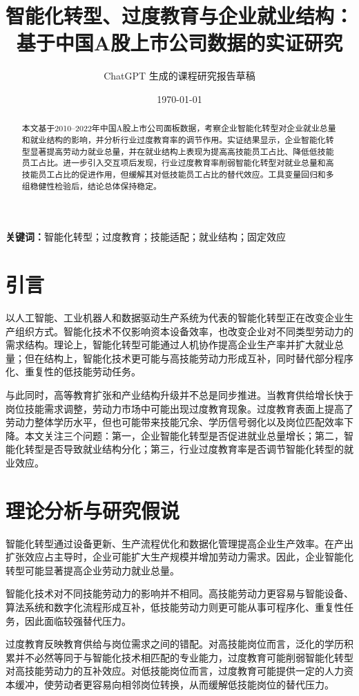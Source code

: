 \documentclass[UTF8,zihao=-4]{ctexart}
\title{智能化转型、过度教育与企业就业结构：基于中国A股上市公司数据的实证研究}
\author{ChatGPT 生成的课程研究报告草稿}
\date{\today}
\begin{document}
\maketitle

\begin{abstract}
本文基于2010--2022年中国A股上市公司面板数据，考察企业智能化转型对企业就业总量和就业结构的影响，并分析行业过度教育率的调节作用。实证结果显示，企业智能化转型显著提高劳动力就业总量，并在就业结构上表现为提高高技能员工占比、降低低技能员工占比。进一步引入交互项后发现，行业过度教育率削弱智能化转型对就业总量和高技能员工占比的促进作用，但缓解其对低技能员工占比的替代效应。工具变量回归和多组稳健性检验后，结论总体保持稳定。
\end{abstract}

\noindent\textbf{关键词：}智能化转型；过度教育；技能适配；就业结构；固定效应

\section{引言}
以人工智能、工业机器人和数据驱动生产系统为代表的智能化转型正在改变企业生产组织方式。智能化技术不仅影响资本设备效率，也改变企业对不同类型劳动力的需求结构。理论上，智能化转型可能通过人机协作提高企业生产率并扩大就业总量；但在结构上，智能化技术更可能与高技能劳动力形成互补，同时替代部分程序化、重复性的低技能劳动任务。

与此同时，高等教育扩张和产业结构升级并不总是同步推进。当教育供给增长快于岗位技能需求调整，劳动力市场中可能出现过度教育现象。过度教育表面上提高了劳动力整体学历水平，但也可能带来技能冗余、学历信号弱化以及岗位匹配效率下降。本文关注三个问题：第一，企业智能化转型是否促进就业总量增长；第二，智能化转型是否导致就业结构分化；第三，行业过度教育率是否调节智能化转型的就业效应。

\section{理论分析与研究假说}
智能化转型通过设备更新、生产流程优化和数据化管理提高企业生产效率。在产出扩张效应占主导时，企业可能扩大生产规模并增加劳动力需求。因此，企业智能化转型可能显著提高企业劳动力就业总量。

智能化技术对不同技能劳动力的影响并不相同。高技能劳动力更容易与智能设备、算法系统和数字化流程形成互补，低技能劳动力则更可能从事可程序化、重复性任务，因此面临较强替代压力。

过度教育反映教育供给与岗位需求之间的错配。对高技能岗位而言，泛化的学历积累并不必然等同于与智能化技术相匹配的专业能力，过度教育可能削弱智能化转型对高技能劳动力的互补效应。对低技能岗位而言，过度教育可能提供一定的人力资本缓冲，使劳动者更容易向相邻岗位转换，从而缓解低技能岗位的替代压力。
\end{document}
